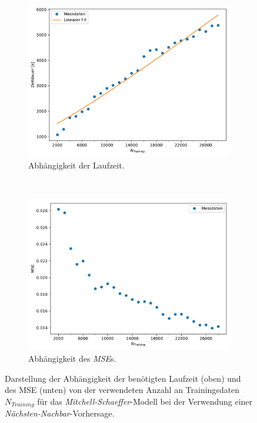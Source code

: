 \begin{appendices}
\begin{figure}[h]
	\centering
	\begin{subfigure}{.95\textwidth}
		\centering
		\hspace*{0.18cm}
		\includegraphics[width=4.8in]{figures/results/cross_prediction/nn_trainlength_vh_time.pdf}
		\caption{Abhängigkeit der Laufzeit.}
	\end{subfigure}
	\\
	\begin{subfigure}{.95\textwidth}
		\centering
		\includegraphics[width=4.8in]{figures/results/cross_prediction/nn_trainlength_vh_mse.pdf}
		\caption{Abhängigkeit des \textit{MSE}s.}
	\end{subfigure}
	\caption{Darstellung der Abhängigkeit der benötigten Laufzeit (oben) und des MSE (unten) von der verwendeten Anzahl an Trainingsdaten $N_{Training}$ für das \textit{Mitchell-Schaeffer}-Modell bei der Verwendung einer \textit{Nächsten-Nachbar}-Vorhersage.}
	\label{fig:apx_exp_cross_nn_trainlength_mse_time_ms}
\end{figure}



\end{appendices}
